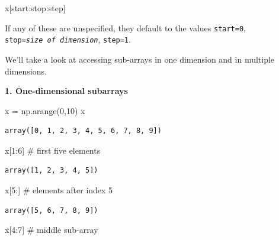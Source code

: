 \documentclass[
  letterpaper,
  DIV=11,
  numbers=noendperiod]{scrreprt}
\newenvironment{Shaded}{\begin{snugshade}}{\end{snugshade}}
\newcommand{\CommentTok}[1]{\textcolor[rgb]{0.37,0.37,0.37}{#1}}
\newcommand{\DecValTok}[1]{\textcolor[rgb]{0.68,0.00,0.00}{#1}}
\newcommand{\NormalTok}[1]{\textcolor[rgb]{0.00,0.23,0.31}{#1}}
\newcommand{\OperatorTok}[1]{\textcolor[rgb]{0.37,0.37,0.37}{#1}}
\theoremstyle{plain}
\theoremstyle{definition}
\theoremstyle{remark}
\begin{document}
\begin{Shaded}
\begin{Highlighting}[]
\NormalTok{x[start:stop:step]}
\end{Highlighting}
\end{Shaded}

If any of these are unspecified, they default to the values
\texttt{start=0}, \texttt{stop=}\emph{\texttt{size\ of\ dimension}},
\texttt{step=1}.

We'll take a look at accessing sub-arrays in one dimension and in
multiple dimensions.

\textbf{1. One-dimensional subarrays}

\begin{Shaded}
\begin{Highlighting}[]
\NormalTok{x }\OperatorTok{=}\NormalTok{ np.arange(}\DecValTok{0}\NormalTok{,}\DecValTok{10}\NormalTok{)}
\NormalTok{x}
\end{Highlighting}
\end{Shaded}

\begin{verbatim}
array([0, 1, 2, 3, 4, 5, 6, 7, 8, 9])
\end{verbatim}

\begin{Shaded}
\begin{Highlighting}[]
\NormalTok{x[}\DecValTok{1}\NormalTok{:}\DecValTok{6}\NormalTok{]  }\CommentTok{\# first five elements}
\end{Highlighting}
\end{Shaded}

\begin{verbatim}
array([1, 2, 3, 4, 5])
\end{verbatim}

\begin{Shaded}
\begin{Highlighting}[]
\NormalTok{x[}\DecValTok{5}\NormalTok{:]  }\CommentTok{\# elements after index 5}
\end{Highlighting}
\end{Shaded}

\begin{verbatim}
array([5, 6, 7, 8, 9])
\end{verbatim}

\begin{Shaded}
\begin{Highlighting}[]
\NormalTok{x[}\DecValTok{4}\NormalTok{:}\DecValTok{7}\NormalTok{]  }\CommentTok{\# middle sub{-}array}
\end{Highlighting}
\end{Shaded}
\end{document}
